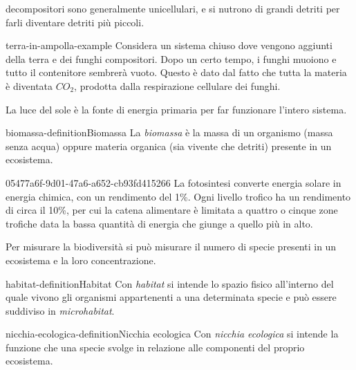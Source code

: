 \documentclass[preview]{standalone}
\begin{document}
\begin{plainhtml}
    decompositori sono generalmente unicellulari, e si nutrono di grandi detriti per farli diventare
    detriti più piccoli.
\end{plainhtml}

\begin{snippetexample}{terra-in-ampolla-example}{}
    Considera un sistema chiuso dove vengono aggiunti della terra e dei funghi compositori.
    Dopo un certo tempo, i funghi muoiono e tutto il contenitore sembrerà vuoto.
    Questo è dato dal fatto che tutta la materia è diventata \(CO_2\),
    prodotta dalla respirazione cellulare dei funghi.
\end{snippetexample}

\begin{plainhtml}
    La luce del sole è la fonte di energia primaria per far funzionare l'intero sistema.
\end{plainhtml}

\begin{snippetdefinition}{biomassa-definition}{Biomassa}
    La \textit{biomassa} è la massa di un organismo (massa senza acqua)
    oppure materia organica (sia vivente che detriti) presente in un ecosistema.
\end{snippetdefinition}

\begin{snippet}{05477a6f-9d01-47a6-a652-cb93fd415266}
    La fotosintesi converte energia solare in energia chimica, con un rendimento del 1\%.
    Ogni livello trofico ha un rendimento di circa il 10\%, per cui la catena alimentare
    è limitata a quattro o cinque zone trofiche data la bassa quantità di energia
    che giunge a quello più in alto.

    Per misurare la biodiversità si può misurare il numero di specie presenti in un ecosistema
    e la loro concentrazione.
\end{snippet}

\begin{snippetdefinition}{habitat-definition}{Habitat}
    Con \textit{habitat} si intende lo spazio fisico all'interno del quale vivono gli organismi
    appartenenti a una determinata specie e può essere suddiviso in \textit{microhabitat}.
\end{snippetdefinition}

\begin{snippetdefinition}{nicchia-ecologica-definition}{Nicchia ecologica}
    Con \textit{nicchia ecologica} si intende la funzione che una specie svolge
    in relazione alle componenti del proprio ecosistema.
\end{snippetdefinition}
\end{document}
